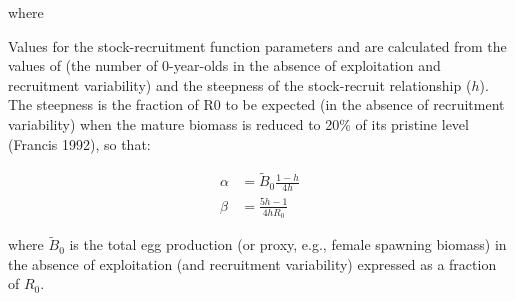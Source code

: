 \documentclass[11pt,
  english,
  a4paper,
]{article}
\begin{document}
\leavevmode\tagmcend\tagstructend\par

where


Values for the stock-recruitment function parameters and are calculated from the values of (the number of 0-year-olds in the absence of exploitation and recruitment variability) and the steepness of the stock-recruit relationship ({\(h\)\leavevmode\tagmcend\tagstructend}). The steepness is the fraction of R0 to be expected (in the absence of recruitment variability) when the mature biomass is reduced to 20\% of its pristine level (Francis 1992), so that:

\leavevmode\tagmcend\tagstructend\par


\begin{align}
 \alpha &= \tilde B_0 \frac{1-h}{4h} \\
 \beta &= \frac{5h-1}{4hR_0 } 
\end{align}

\leavevmode\tagmcend\tagstructend\par


where {\(\tilde B_0\)\leavevmode\tagmcend\tagstructend} is the total egg production (or proxy, e.g., female spawning biomass) in the absence of exploitation (and recruitment variability) expressed as a fraction of {\(R_0\)\leavevmode\tagmcend\tagstructend}.

\leavevmode\tagmcend\tagstructend\par

\end{document}
